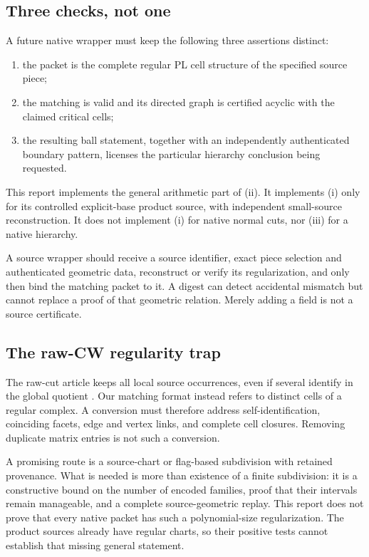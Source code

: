 \documentclass[11pt,letterpaper]{article}
\theoremstyle{definition}
\theoremstyle{remark}\newtheorem{remark}[theorem]{Remark}
\newcommand{\code}[1]{\texttt{\detokenize{#1}}}
\begin{document}
\subsection{Three checks, not one}

A future native wrapper must keep the following three assertions distinct:
\begin{enumerate}[label=(\roman*),leftmargin=*]
\item the packet is the complete regular PL cell structure of the specified source piece;
\item the matching is valid and its directed graph is certified acyclic with the claimed critical cells;
\item the resulting ball statement, together with an independently authenticated boundary pattern, licenses the particular hierarchy conclusion being requested.
\end{enumerate}

This report implements the general arithmetic part of (ii). It implements (i) only for its controlled explicit-base product source, with independent small-source reconstruction. It does not implement (i) for native normal cuts, nor (iii) for a native hierarchy.

A source wrapper should receive a source identifier, exact piece selection and authenticated geometric data, reconstruct or verify its regularization, and only then bind the matching packet to it. A digest can detect accidental mismatch but cannot replace a proof of that geometric relation. Merely adding a field \code{regular: true} is not a source certificate.

\subsection{The raw-CW regularity trap}

The raw-cut article keeps all local source occurrences, even if several identify in the global quotient \cite{repo-cut}. Our matching format instead refers to distinct cells of a regular complex. A conversion must therefore address self-identification, coinciding facets, edge and vertex links, and complete cell closures. Removing duplicate matrix entries is not such a conversion.

A promising route is a source-chart or flag-based subdivision with retained provenance. What is needed is more than existence of a finite subdivision: it is a constructive bound on the number of encoded families, proof that their intervals remain manageable, and a complete source-geometric replay. This report does not prove that every native packet has such a polynomial-size regularization. The product sources already have regular charts, so their positive tests cannot establish that missing general statement.
\end{document}
